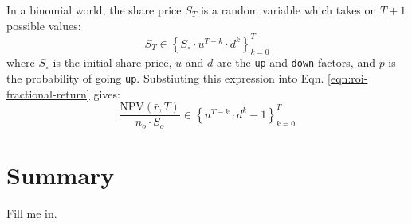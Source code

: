 \documentclass[11pt]{article}
\theoremstyle{definition}
\begin{document}
In a binomial world, the share price $S_{T}$ is a random variable which takes on $T+1$ possible values:
\begin{equation}
S_{T} \in \left\{S_{\circ}\cdot{u}^{T-k}\cdot{d}^{k}\right\}_{k=0}^{T}
\end{equation}
where $S_{\circ}$ is the initial share price, $u$ and $d$ are the \texttt{up} and \texttt{down} factors, and $p$ is the probability of going \texttt{up}.
Substiuting this expression into Eqn. \eqref{eqn:roi-fractional-return} gives:
\begin{equation}
	\frac{\text{NPV}(\bar{r}, T)}{n_{o}\cdot{S_{o}}} \in \left\{u^{T-k}\cdot{d}^{k} - 1\right\}_{k=0}^{T}
\end{equation}

\section*{Summary}
Fill me in.

\clearpage
\printindex
\end{document}
